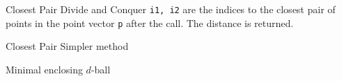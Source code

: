 \clearpage
{}
\categorycontents{}



\begin{algorithm}{Closest Pair Divide and Conquer}
\desc
{\tt i1, i2} are the indices to the closest pair of points in the point
vector {\tt p} after the call. The distance is returned.
\end{algorithm}

\begin{algorithm}{Closest Pair Simpler method}
\end{algorithm}

\begin{algorithm}{Minimal enclosing $d$-ball}
\end{algorithm}




